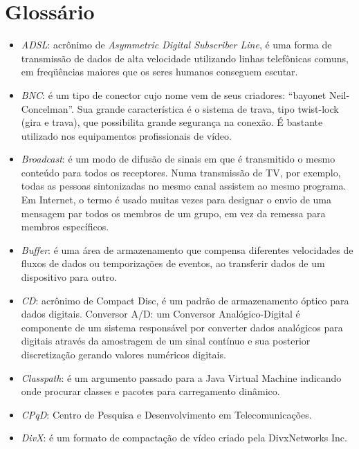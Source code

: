 \chapter*{Glossário} %
\label{cha:glossario}

\begin{itemize}

  \item \emph{ADSL}: acrônimo de \emph{Asymmetric Digital Subscriber Line}, é uma forma de transmissão de dados de alta velocidade utilizando linhas telefônicas comuns, em freqüências maiores que os seres humanos conseguem escutar.

  \item \emph{BNC}: é um tipo de conector cujo nome vem de seus criadores: ``bayonet Neil-Concelman''. Sua grande característica é o sistema de trava, tipo twist-lock (gira e trava), que possibilita grande segurança na conexão. É bastante utilizado nos equipamentos profissionais de vídeo.

  \item \emph{Broadcast}: é um modo de difusão de sinais em que é transmitido o mesmo conteúdo para todos os receptores. Numa transmissão de TV, por exemplo, todas as pessoas sintonizadas no mesmo canal assistem ao mesmo programa. Em Internet, o termo é usado muitas vezes para designar o envio de uma mensagem par todos os membros de um grupo, em vez da remessa para membros específicos.

  \item \emph{Buffer}: é uma área de armazenamento que compensa diferentes velocidades de fluxos de dados ou temporizações de eventos, ao transferir dados de um dispositivo para outro.

  \item \emph{CD}: acrônimo de Compact Disc, é um padrão de armazenamento óptico para dados digitais.
  Conversor A/D: um Conversor Analógico-Digital é componente de um sistema responsável por converter dados analógicos para digitais através da amostragem de um sinal contínuo e sua posterior discretização gerando valores numéricos digitais.

  \item \emph{Classpath}: é um argumento passado para a Java Virtual Machine indicando onde procurar classes e pacotes para carregamento dinâmico.

  \item \emph{CPqD}: {C}entro de {P}es{q}uisa e {D}esenvolvimento em Telecomunicações.

  \item \emph{DivX}: é um formato de compactação de vídeo criado pela DivxNetworks Inc.


\end{itemize}
